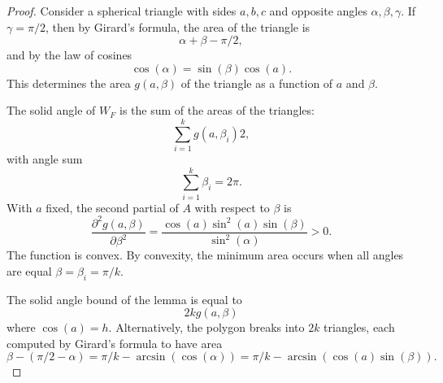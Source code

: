 \begin{proof}
Consider a spherical triangle with sides $a,b,c$ and opposite angles
$\alpha,\beta,\gamma$.  If $\gamma=\pi/2$, then by Girard's formula,
the area of the triangle is
\begin{displaymath}
\alpha+\beta-\pi/2,
\end{displaymath}
and by the law of cosines 
\begin{displaymath}
\cos(\alpha) =\sin(\beta)\cos(a).
\end{displaymath}
This determines the area $g(a,\beta)$ of the triangle 
as a function of $a$ and $\beta$. 
%
%
%
%
%
%
%
%

The solid angle of $W_F$ is the sum of the areas of the triangles:
\begin{displaymath}
\sum_{i=1}^k g(a,\beta_i) 2,
\end{displaymath}
with angle sum
\begin{displaymath}
\sum_{i=1}^k \beta_i = 2\pi.
\end{displaymath}
With  $a$ fixed, the second partial of $A$ with respect to $\beta$ is
\begin{displaymath}
\frac{\partial^2 g(a,\beta)}{\partial \beta^2} = 
\frac{\cos(a)\sin^2(a)\sin(\beta)}{\sin^2(\alpha)} > 0.
\end{displaymath}
The function is convex.
By convexity, the minimum area occurs when all angles are equal
$\beta=\beta_i = \pi/k$.

The solid angle bound of the lemma is equal to 
\begin{displaymath}
2 k g(a,\beta)
\end{displaymath}
where $\cos(a)=h$.  Alternatively, the polygon breaks into $2k$
triangles, each computed by Girard's formula to have area
\begin{displaymath}
\beta - (\pi/2 - \alpha)  = \pi/k - \arcsin(\cos(\alpha)) = 
\pi/k - \arcsin(\cos(a)\sin(\beta)).
\end{displaymath}
\end{proof}




